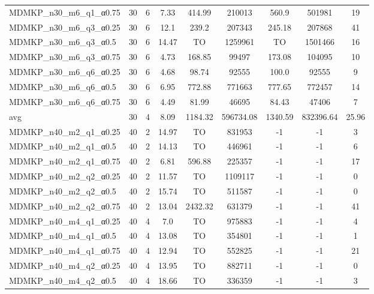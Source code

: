 \begin{table}[!ht]
{\begin{tabular}{lcccccccc}
MDMKP\_n30\_m6\_q1\_α0.75 & 30 & 6 &  \textcolor{blue2}{7.33} & 414.99 & 210013 & 560.9 & 501981 & 19 \\
MDMKP\_n30\_m6\_q3\_α0.25 & 30 & 6 &  \textcolor{blue2}{12.1} & 239.2 & 207343 & 245.18 & 207868 & 41 \\
MDMKP\_n30\_m6\_q3\_α0.5 & 30 & 6 &  \textcolor{blue2}{14.47} & TO & 1259961 & TO & 1501466 & 16 \\
MDMKP\_n30\_m6\_q3\_α0.75 & 30 & 6 &  \textcolor{blue2}{4.73} & 168.85 & 99497 & 173.08 & 104095 & 10 \\
MDMKP\_n30\_m6\_q6\_α0.25 & 30 & 6 &  \textcolor{blue2}{4.68} & 98.74 & 92555 & 100.0 & 92555 & 9 \\
MDMKP\_n30\_m6\_q6\_α0.5 & 30 & 6 &  \textcolor{blue2}{6.95} & 772.88 & 771663 & 777.65 & 772457 & 14 \\
MDMKP\_n30\_m6\_q6\_α0.75 & 30 & 6 &  \textcolor{blue2}{4.49} & 81.99 & 46695 & 84.43 & 47406 & 7 \\
\cline{1-9} avg & 30 & 4 & 8.09 & 1184.32& 596734.08 & 1340.59& 832396.64 & 25.96\\ \cline{1-9}
MDMKP\_n40\_m2\_q1\_α0.25 & 40 & 2 &  \textcolor{blue2}{14.97} & TO & 831953 & -1 & -1 & 3 \\
MDMKP\_n40\_m2\_q1\_α0.5 & 40 & 2 &  \textcolor{blue2}{14.13} & TO & 446961 & -1 & -1 & 6 \\
MDMKP\_n40\_m2\_q1\_α0.75 & 40 & 2 &  \textcolor{blue2}{6.81} & 596.88 & 225357 & -1 & -1 & 17 \\
MDMKP\_n40\_m2\_q2\_α0.25 & 40 & 2 &  \textcolor{blue2}{11.57} & TO & 1109117 & -1 & -1 & 0 \\
MDMKP\_n40\_m2\_q2\_α0.5 & 40 & 2 &  \textcolor{blue2}{15.74} & TO & 511587 & -1 & -1 & 0 \\
MDMKP\_n40\_m2\_q2\_α0.75 & 40 & 2 &  \textcolor{blue2}{13.04} & 2432.32 & 631379 & -1 & -1 & 41 \\
MDMKP\_n40\_m4\_q1\_α0.25 & 40 & 4 &  \textcolor{blue2}{7.0} & TO & 975883 & -1 & -1 & 4 \\
MDMKP\_n40\_m4\_q1\_α0.5 & 40 & 4 &  \textcolor{blue2}{13.08} & TO & 354801 & -1 & -1 & 1 \\
MDMKP\_n40\_m4\_q1\_α0.75 & 40 & 4 &  \textcolor{blue2}{12.94} & TO & 552825 & -1 & -1 & 21 \\
MDMKP\_n40\_m4\_q2\_α0.25 & 40 & 4 &  \textcolor{blue2}{13.95} & TO & 882711 & -1 & -1 & 0 \\
MDMKP\_n40\_m4\_q2\_α0.5 & 40 & 4 &  \textcolor{blue2}{18.66} & TO & 336359 & -1 & -1 & 3 \\

\end{tabular}}
\end{table}
